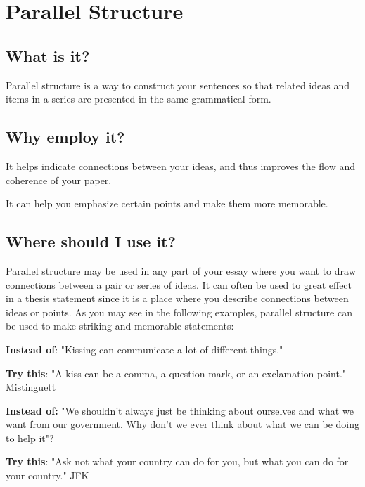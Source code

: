 \chapter{Parallel Structure}

\section{What is it?}

Parallel structure is a way to construct your sentences so that related ideas and items 
in a series are presented in the same grammatical form.

\section{Why employ it?}

It helps indicate connections between your ideas, and thus improves the flow and 
coherence of your paper.

It can help you emphasize certain points and make them more memorable.

\section{Where should I use it?}

Parallel structure may be used in any part of your essay where you want to draw 
connections between a pair or series of ideas. It can often be used to great effect in a 
thesis statement since it is a place where you describe connections between ideas or 
points. As you may see in the following examples, parallel structure can be used to make 
striking and memorable statements:

\textbf{Instead of}: "Kissing can communicate a lot of different things." 

\textbf{Try this}: "A kiss can be a comma, a question mark, or an exclamation point." 
\textemdash Mistinguett

\textbf{Instead of:} "We shouldn't always just be thinking about ourselves and what 
we want from our government. Why don't we ever think about what we can be doing to help it"?

\textbf{Try this}: "Ask not what your country can do for you, but what you can do for 
your country." \textemdash JFK

